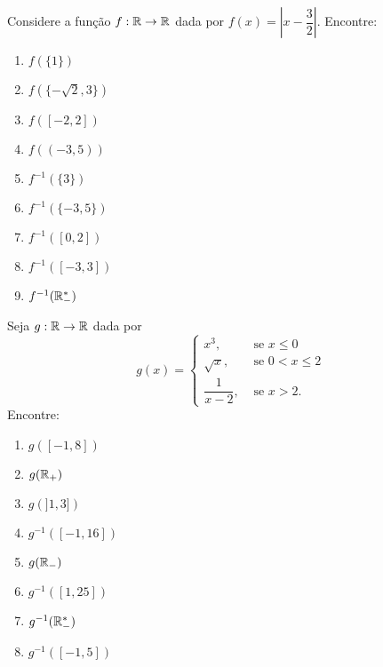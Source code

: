 \documentclass[12pt]{exam}
\begin{document}
    \vspace{.6cm}

    \questao{} Considere a fun\c{c}\~ao $f : \mathbb{R} \to \mathbb{R}$ dada por $f(x) = \left| x - \dfrac{3}{2}\right|$. Encontre:
    \begin{multicols}{3}
        \begin{enumerate}[label={\alph*})]
            \item $f(\{1\})$

            \item $f(\{-\sqrt{2}, 3\})$

            \item $f([-2,2])$

            \item $f((-3,5))$

            \item $f^{-1}(\{3\})$

            \item $f^{-1}(\{-3,5\})$

            \item $f^{-1}([0,2])$

            \item $f^{-1}([-3,3])$

            \item $f^{-1}(\mathbb{R}^*_-)$
        \end{enumerate}
    \end{multicols}

    \vspace{.3cm}

    \questao{} Seja $g : \mathbb{R} \to \mathbb{R}$ dada por
    \[
        g(x) = \begin{cases}
            x^3,& \mbox{ se } x \le 0\\
            \sqrt{x}, & \mbox{ se } 0 < x \le 2\\
            \dfrac{1}{x - 2}, & \mbox{ se } x > 2.
        \end{cases}
    \]
    Encontre:
    \begin{multicols}{2}
        \begin{enumerate}[label={\alph*})]
            \item $g([-1,8])$

            \item $g(\mathbb{R}_+)$

            \item $g(]1, 3])$

            \item $g^{-1}([-1,16])$

            \item $g(\mathbb{R}_-)$

            \item $g^{-1}([1,25])$

            \item $g^{-1}(\mathbb{R}^*_-)$

            \item $g^{-1}([-1,5])$
        \end{enumerate}
    \end{multicols}
\end{document}
